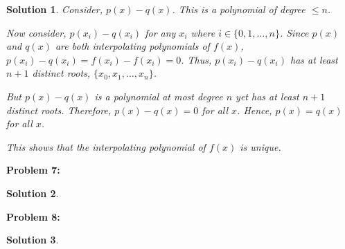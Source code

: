 \documentclass[12pt, letterpaper]{article}
\theoremstyle{nonumberplain}
\newtheorem{sol}{Solution}
\begin{document}
\begin{sol}
	Consider, $p(x) - q(x)$. This is a polynomial of degree $\leq n$.

	Now consider, $p(x_i) - q(x_i)$ for any $x_i$ where $i \in \{0, 1, \ldots, n\}$. Since $p(x)$ and $q(x)$ are both interpolating polynomials of $f(x)$, $p(x_i) - q(x_i) = f(x_i) - f(x_i) = 0$. Thus, $p(x_i) - q(x_i)$ has at least $n+1$ distinct roots, $\{x_0, x_1, \ldots, x_n\}$.

	But $p(x) - q(x)$ is a polynomial at most degree $n$ yet has at least $n+1$ distinct roots. Therefore, $p(x) - q(x) = 0$ for all $x$. Hence, $p(x) = q(x)$ for all $x$.

	This shows that the interpolating polynomial of $f(x)$ is unique.

\end{sol}

\hspace{18pt}\textbf{Problem 7:} \medskip
\begin{sol}

\end{sol}

\hspace{18pt}\textbf{Problem 8:} \medskip
\begin{sol}

\end{sol}
\end{document}
